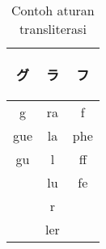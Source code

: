 \documentclass[../main/main.tex]{subfiles}
\begin{document}
\begin{table}[htbp]
	\centering
	\caption{Contoh aturan transliterasi}
	\label{tbl:studi_transliterasi}
	\begin{tabular}{|c|c|c|}
		\hline
		\begin{CJK}{UTF8}{min} グ \end{CJK} & \begin{CJK}{UTF8}{min} ラ \end{CJK} & \begin{CJK}{UTF8}{min} フ \end{CJK}\\ \hline
		g & ra & f\\
		gue & la & phe\\
		gu & l & ff\\
		& lu & fe\\
		& r & \\
		& ler & \\ \hline
	\end{tabular}
\end{table}
\end{document}
